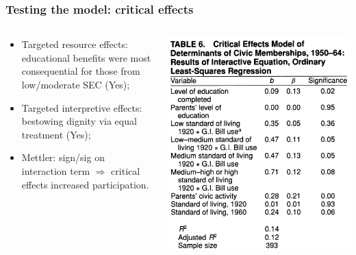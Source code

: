 \documentclass[aspectratio=169]{beamer}
\theoremstyle{principle}
\begin{document}
\begin{frame}
\frametitle{Testing the model: critical effects}
\begin{columns}
\begin{column}{0.5\textwidth}

\begin{itemize}
\item Targeted resource effects: educational benefits were most consequential for those from low/moderate SEC (Yes);
\bigskip
\bigskip
\item Targeted interpretive effects: bestowing dignity via equal treatment (Yes);
\bigskip
\bigskip
\item Mettler: sign/sig on interaction term $\Rightarrow$ critical effects increased participation.
\end{itemize}
\end{column}
\begin{column}{0.5\textwidth}
\begin{center}
\includegraphics[scale=0.35]{table_6.png}
\end{center}
\end{column}
\end{columns}

\end{frame}
\end{document}
